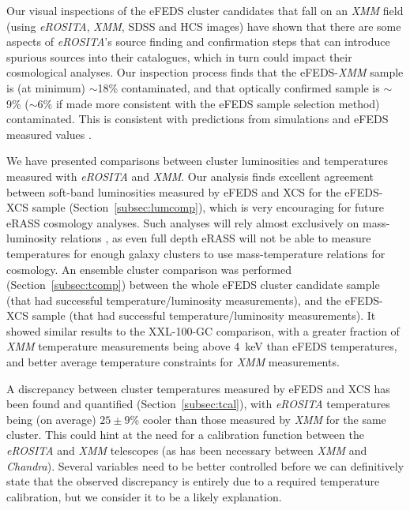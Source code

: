 \documentclass[fleqn,usenatbib]{mnras}
\begin{document}
Our visual inspections of the eFEDS cluster candidates that fall on an {\em XMM} field (using {\em eROSITA}, {\em XMM}, SDSS and HCS images) have shown that there are some aspects of {\em eROSITA}'s source finding and confirmation steps that can introduce spurious sources into their catalogues, which in turn could impact their cosmological analyses. Our inspection process finds that the eFEDS-{\em XMM} sample is (at minimum) ${\sim}$18\% contaminated, and that optically confirmed sample is ${\sim}$9\% (${\sim}$6\% if made more consistent with the eFEDS sample selection method) contaminated. This is consistent with predictions from simulations \citep[][]{simerass} and eFEDS measured values \citep[][]{efedsclusteropticalcat}.

We have presented comparisons between cluster luminosities and temperatures measured with {\em eROSITA} and {\em XMM}. Our analysis finds excellent agreement between soft-band luminosities measured by eFEDS and XCS for the eFEDS-XCS sample (Section~\ref{subsec:lumcomp}), which is very encouraging for future eRASS cosmology analyses. Such analyses will rely almost exclusively on mass-luminosity relations \citep[such as the recent eFEDS-HSC work, ][]{efedsmor}, as even full depth eRASS will not be able to measure temperatures for enough galaxy clusters to use mass-temperature relations for cosmology. 
An ensemble cluster comparison was performed (Section~\ref{subsec:tcomp}) between the whole eFEDS cluster candidate sample (that had successful temperature/luminosity measurements), and the eFEDS-XCS sample (that had successful temperature/luminosity measurements). It showed similar results to the XXL-100-GC comparison, with a greater fraction of {\em XMM} temperature measurements being above 4~keV than eFEDS temperatures, and better average temperature constraints for {\em XMM} measurements.

A discrepancy between cluster temperatures measured by eFEDS and XCS has been found and quantified (Section~\ref{subsec:tcal}), with {\em eROSITA} temperatures being (on average) $25{\pm}9$\% cooler than those measured by {\em XMM} for the same cluster. This could hint at the need for a calibration function between the {\em eROSITA} and {\em XMM} telescopes (as has been necessary between {\em XMM} and {\em Chandra}). Several variables need to be better controlled before we can definitively state that the observed discrepancy is entirely due to a required temperature calibration, but we consider it to be a likely explanation. 
\end{document}

